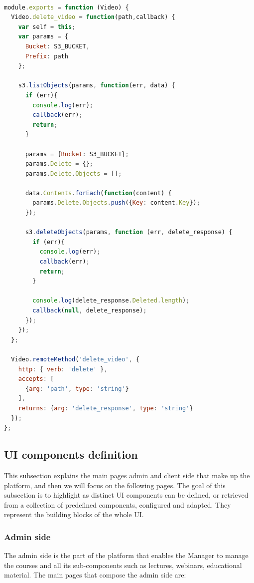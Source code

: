 \begin{lstlisting}[language=javascript]

module.exports = function (Video) {
  Video.delete_video = function(path,callback) {
    var self = this;
    var params = {
      Bucket: S3_BUCKET,
      Prefix: path
    };

    s3.listObjects(params, function(err, data) {
      if (err){
        console.log(err);
        callback(err);
        return;
      } 

      params = {Bucket: S3_BUCKET};
      params.Delete = {};
      params.Delete.Objects = [];

      data.Contents.forEach(function(content) {
        params.Delete.Objects.push({Key: content.Key});
      });

      s3.deleteObjects(params, function (err, delete_response) {
        if (err){
          console.log(err);
          callback(err);
          return;
        }

        console.log(delete_response.Deleted.length);
        callback(null, delete_response);
      });
    });
  };

  Video.remoteMethod('delete_video', {
    http: { verb: 'delete' },
    accepts: [
      {arg: 'path', type: 'string'}
    ],
    returns: {arg: 'delete_response', type: 'string'}
  });
};
\end{lstlisting}

\subsection {UI components definition}
\label{subsec:components_definition}
This subsection explains the main pages admin and client side that make up the platform, and then we will focus on the following pages.
The goal of this subsection is to highlight as distinct UI components can be defined, or retrieved from a collection of predefined components, configured and adapted. They represent the building blocks of the whole UI.


\subsubsection {Admin side}
\label{subsec:Admin_side}
The admin side is the part of the platform that enables the Manager to manage the courses and all its sub-components such as lectures, webinars, educational material.
The main pages that compose the admin side are:

